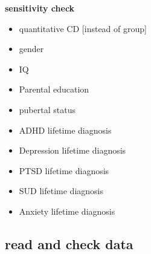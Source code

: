 \documentclass[
]{article}
\providecommand{\tightlist}{%
  \setlength{\itemsep}{0pt}\setlength{\parskip}{0pt}}
\begin{document}
\textbf{sensitivity check}

\begin{itemize}
\tightlist
\item
  quantitative CD {[}instead of group{]}
\item
  gender
\item
  IQ
\item
  Parental education
\item
  pubertal status
\item
  ADHD lifetime diagnosis
\item
  Depression lifetime diagnosis
\item
  PTSD lifetime diagnosis
\item
  SUD lifetime diagnosis
\item
  Anxiety lifetime diagnosis
\end{itemize}

\hypertarget{read-and-check-data}{%
\subsection{read and check data}\label{read-and-check-data}}
\end{document}
